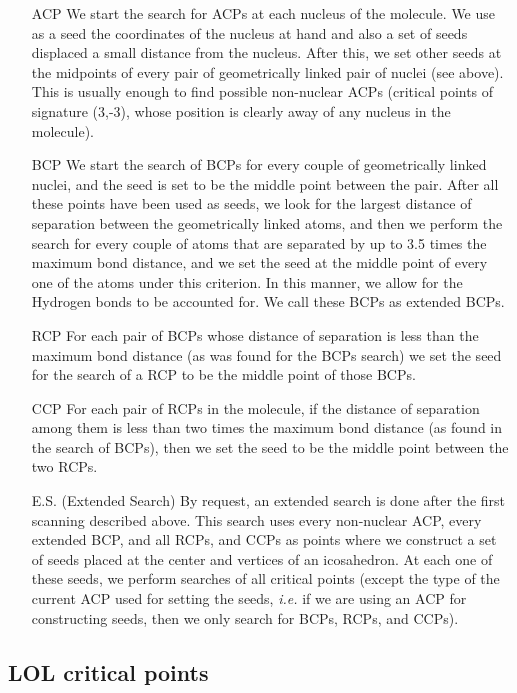 \begin{itemize}
\item[ACP] We start the search for ACPs at each nucleus of the molecule. We use as a seed the 
  coordinates of the nucleus at hand and also a set of seeds displaced a small distance from
  the nucleus. After this, we set other seeds at the midpoints of every pair of 
  geometrically linked pair of nuclei (see above). This is usually enough to find possible
  non-nuclear ACPs (critical points of signature (3,-3), whose position is clearly away
  of any nucleus in the molecule).
\item[BCP] We start the search of BCPs for every couple of geometrically linked nuclei, and the seed
  is set to be the middle point between the pair. After all these points have been used as seeds,
  we look for the largest distance of separation between the geometrically linked atoms,
  and then we perform the search for every couple of atoms that are separated by up to 3.5
  times the maximum bond distance, and we set the seed at the middle point of every one of
  the atoms under this criterion. In this manner, we allow for the Hydrogen bonds
  to be accounted for. We call these BCPs as extended BCPs.
\item[RCP] For each pair of BCPs whose distance of separation is less than the maximum bond distance (as was found for the BCPs search) we set the seed for the search of a RCP to be the middle point of those BCPs.
\item[CCP] For each pair of RCPs in the molecule, if the distance of separation among them is less than two times the maximum bond distance (as found in the search of BCPs), then we set the seed to be the middle point between the two RCPs.
\item [E.S.] (Extended Search) By request, an extended search is done after the first scanning described 
  above. This search uses every non-nuclear ACP, every extended BCP, and all RCPs, and CCPs as 
  points where we construct a set of seeds placed at the center and vertices of an
  icosahedron. At each one of these seeds, we perform searches of all critical points (except the
  type of the current ACP used for setting the seeds, \textit{i.e.} if we are using an ACP for 
  constructing seeds, then we only search for BCPs, RCPs, and CCPs).
\end{itemize}

\subsection{LOL critical points}

